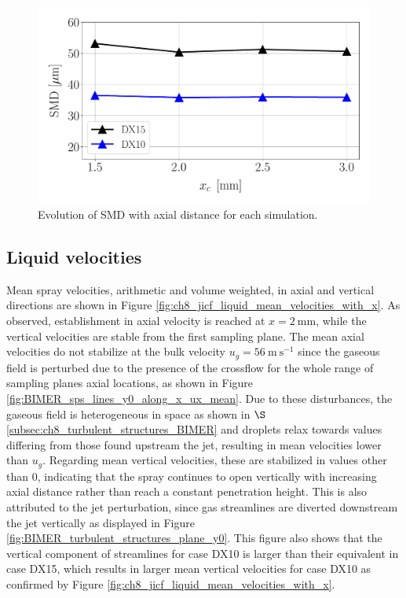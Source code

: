 \begin{figure}[ht]
\centering
   \includegraphics[scale=0.35]{./part3_applications/figures_ch8_resolved/SPRAY_characterization/SMD_values}
   \vspace*{-0.2in}
   \caption{Evolution of SMD with axial distance for each simulation.}
   \label{fig:ch8_spray_char_SMD_final}
\end{figure}





\subsection{Liquid velocities}

Mean spray velocities, arithmetic and volume weighted, in axial and vertical directions are shown in Figure \ref{fig:ch8_jicf_liquid_mean_velocities_with_x}. As observed, establishment in axial velocity is reached at $x = 2~\mathrm{mm}$, while the vertical velocities are stable from the first sampling plane. The mean axial velocities do not stabilize at the bulk velocity $u_g = 56~\mathrm{m~s}^{-1}$ since the gaseous field is perturbed due to the presence of the crossflow for the whole range of sampling planes axial locations, as shown in Figure \ref{fig:BIMER_sps_lines_y0_along_x_ux_mean}.   Due to these disturbances, the gaseous field is heterogeneous in space as shown in $\S$\ref{subsec:ch8_turbulent_structures_BIMER} and droplets relax towards values differing from those found upstream the jet, resulting in mean velocities lower than $u_g$. Regarding mean vertical velocities, these are stabilized in values other than $0$, indicating that the spray continues to open vertically with increasing axial distance rather than reach a constant penetration height. This is also attributed to the jet perturbation, since gas streamlines are diverted downstream the jet vertically as displayed in Figure \ref{fig:BIMER_turbulent_structures_plane_y0}. This figure also shows that the vertical component of streamlines for case DX10 is larger than their equivalent in case DX15, which results in larger mean vertical velocities for case DX10 as confirmed by Figure \ref{fig:ch8_jicf_liquid_mean_velocities_with_x}.

